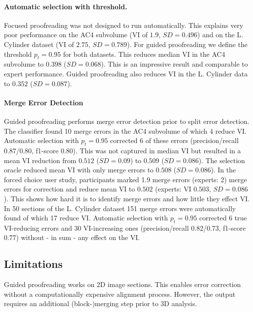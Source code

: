 \paragraph{Automatic selection with threshold.} Focused proofreading was not designed to run automatically. This explains very poor performance on the AC4 subvolume (VI of $1.9$, $SD=0.496$) and on the L. Cylinder dataset (VI of $2.75$, $SD=0.789$). For guided proofreading we define the threshold $p_t=0.95$ for both datasets. This reduces median VI in the AC4 subvolume to $0.398$ ($SD=0.068$). This is an impressive result and comparable to expert performance. Guided proofreading also reduces VI in the L. Cylinder data to $0.352$ ($SD=0.087$).

\paragraph{Merge Error Detection} Guided proofreading performs merge error detection prior to split error detection. The classifier found 10 merge errors in the AC4 subvolume of which 4 reduce VI. Automatic selection with $p_t=0.95$ corrected 6 of these errors (precision/recall 0.87/0.80, f1-score 0.80). This was not captured in median VI but resulted in a mean VI reduction from $0.512$ ($SD=0.09$) to $0.509$ ($SD=0.086$). The selection oracle reduced mean VI with only merge errors to $0.508$ ($SD=0.086$). In the forced choice user study, participants marked 1.9 merge errors (experts: 2) merge errors for correction and reduce mean VI to $0.502$ (experts: VI $0.503$, $SD=0.086$). This shows how hard it is to identify merge errors and how little they effect VI. In 50 sections of the L. Cylinder dataset 151 merge errors were automatically found of which 17 reduce VI. Automatic selection with $p_t=0.95$ corrected 6 true VI-reducing errors and 30 VI-increasing ones (precision/recall 0.82/0.73, f1-score 0.77) without - in sum - any effect on the VI. 

\subsection{Limitations}
Guided proofreading works on 2D image sections. This enables error correction without a computationally expensive alignment process. However, the output requires an additional (block-)merging step prior to 3D  analysis.
